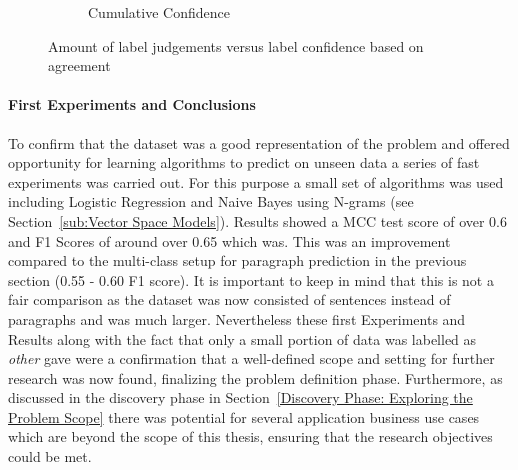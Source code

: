 \begin{figure}[h]
\begin{subfigure}[b]{0.43\textwidth}
        \caption{Cumulative Confidence}
\label{fig:sentence-data-judgement-confidence-cumulative}
    \end{subfigure}
    \caption{Amount of label judgements versus label confidence based on agreement}
\label{fig:sentence-data-judgements}
\end{figure}

\paragraph{First Experiments and Conclusions}
\label{par:First Experiments and Conclusions}

To confirm that the dataset was a good representation of the problem and offered opportunity for learning algorithms to predict on unseen data a series of fast experiments was carried out.
For this purpose a small set of algorithms was used including Logistic Regression and Naive Bayes using N-grams (see Section~\ref{sub:Vector Space Models}). Results showed a \gls{MCC} test score of over 0.6 and F1 Scores of around over 0.65 which was. This was an improvement compared to the multi-class setup for paragraph prediction in the previous section (0.55 - 0.60 F1 score).
It is important to keep in mind that this is not a fair comparison as the dataset was now consisted of sentences instead of paragraphs and was much larger.
Nevertheless these first Experiments and Results along with the fact that only a small portion of data was labelled as \emph{other} gave were a confirmation that a well-defined scope and setting for further research was now found, finalizing the problem definition phase. Furthermore, as discussed in the discovery phase in Section~\ref{Discovery Phase: Exploring the Problem Scope} there was potential for several application business use cases which are beyond the scope of this thesis, ensuring that the research objectives could be met.
